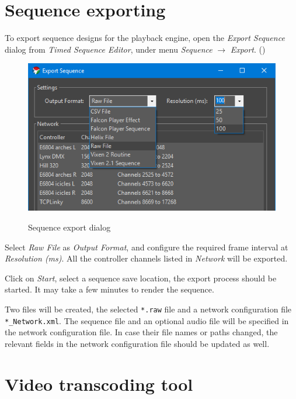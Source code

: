 \renewcommand{\baselinestretch}{\mystretch}
\label{chap:Guide}

\section{Sequence exporting}

To export sequence designs for the playback engine, open the \textit{Export Sequence} dialog from \textit{Timed Sequence Editor}, under menu \textit{Sequence} $\rightarrow$ \textit{Export}. ()

\begin{figure}[!htb]
  \centering
  \includegraphics[width=0.75\columnwidth]{Figs/vixen_export.png}
  \label{fig:guide_export}
  \caption{\footnotesize Sequence export dialog}
\end{figure}

Select \textit{Raw File} as \textit{Output Format}, and configure the required frame interval at \textit{Resolution (ms)}. All the controller channels listed in \textit{Network} will be exported.

Click on \textit{Start}, select a sequence save location, the export process should be started. It may take a few minutes to render the sequence.

Two files will be created, the selected \texttt{*.raw} file and a network configuration file \texttt{*\_Network.xml}. The sequence file and an optional audio file will be specified in the network configuration file. In case their file names or paths changed, the relevant fields in the network configuration file should be updated as well.

\section{Video transcoding tool}

